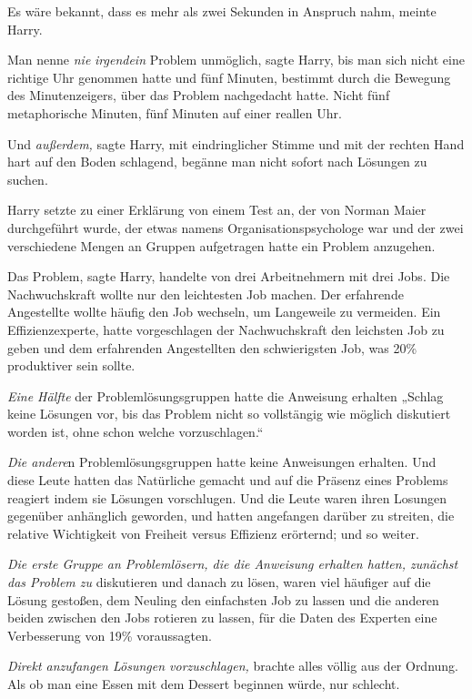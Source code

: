 {Es wäre bekannt, dass es mehr als zwei Sekunden in Anspruch nahm, meinte Harry.

Man nenne \emph{nie} \emph{irgendein} Problem unmöglich, sagte Harry, bis man sich nicht eine richtige Uhr genommen hatte und fünf Minuten, bestimmt durch die Bewegung des Minutenzeigers, über das Problem nachgedacht hatte. Nicht fünf metaphorische Minuten, fünf Minuten auf einer reallen Uhr.

Und \emph{außerdem,} sagte Harry, mit eindringlicher Stimme und mit der rechten Hand hart auf den Boden schlagend, begänne man nicht sofort nach Lösungen zu suchen.

Harry setzte zu einer Erklärung von einem Test an, der von Norman Maier durchgeführt wurde, der etwas namens Organisationspsychologe war und der zwei verschiedene Mengen an Gruppen aufgetragen hatte ein Problem anzugehen.

Das Problem, sagte Harry, handelte von drei Arbeitnehmern mit drei Jobs. Die Nachwuchskraft wollte nur den leichtesten Job machen. Der erfahrende Angestellte wollte häufig den Job wechseln, um Langeweile zu vermeiden. Ein Effizienzexperte, hatte vorgeschlagen der Nachwuchskraft den leichsten Job zu geben und dem erfahrenden Angestellten den schwierigsten Job, was 20\% produktiver sein sollte.

\emph{Eine Hälfte} der Problemlösungsgruppen hatte die Anweisung erhalten „Schlag keine Lösungen vor, bis das Problem nicht so vollstängig wie möglich diskutiert worden ist, ohne schon welche vorzuschlagen.“

\emph{Die andere}n Problemlösungsgruppen hatte keine Anweisungen erhalten. Und diese Leute hatten das Natürliche gemacht und auf die Präsenz eines Problems reagiert indem sie Lösungen vorschlugen. Und die Leute waren ihren Losungen gegenüber anhänglich geworden, und hatten angefangen darüber zu streiten, die relative Wichtigkeit von Freiheit versus Effizienz erörternd; und so weiter.

\emph{Die erste Gruppe an Problemlösern, die die Anweisung erhalten hatten, zunächst das Problem zu} diskutieren und danach zu lösen, waren viel häufiger auf die Lösung gestoßen, dem Neuling den einfachsten Job zu lassen und die anderen beiden zwischen den Jobs rotieren zu lassen, für die Daten des Experten eine Verbesserung von 19\% voraussagten.

\emph{Direkt anzufangen Lösungen vorzuschlagen,} brachte alles völlig aus der Ordnung. Als ob man eine Essen mit dem Dessert beginnen würde, nur schlecht.

}
